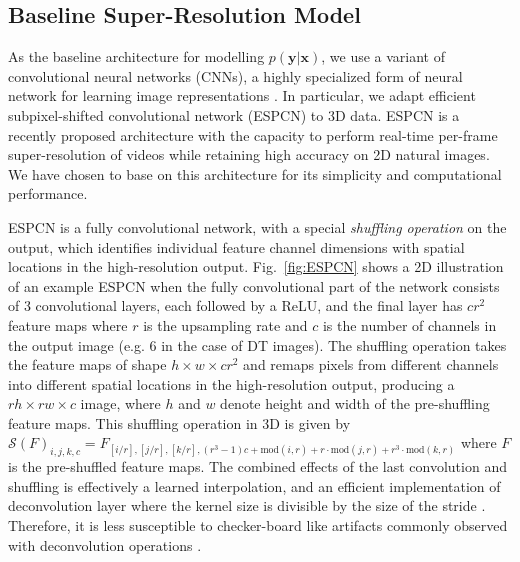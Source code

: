 \subsection{Baseline Super-Resolution Model} \label{sec:baseline}
As the baseline architecture for modelling $p(\mathbf{y}|\mathbf{x})$, we use a variant of convolutional neural networks (CNNs), a highly specialized form of neural network for learning image representations \cite{lecun2015deep,goodfellow2016deep}. In particular, we adapt efficient subpixel-shifted convolutional network (ESPCN) \cite{shi2016real} to 3D data.  ESPCN is a recently proposed architecture with the capacity to perform real-time per-frame super-resolution of videos while retaining high accuracy on 2D natural images. We have chosen to base on this architecture for its simplicity and computational performance. %

ESPCN is a fully convolutional network, with a special \emph{shuffling operation} on the output, which identifies individual feature channel dimensions with spatial locations in the high-resolution output. Fig.~\ref{fig:ESPCN} shows a 2D illustration of an example ESPCN when the fully convolutional part of the network consists of 3 convolutional layers, each followed by a ReLU, and the final layer has $cr^2$ feature maps where $r$ is the upsampling rate and $c$ is the number of channels in the output image (e.g. $6$ in the case of DT images). The shuffling operation takes the feature maps of shape $h\times w\times cr^2$ and remaps pixels from different channels into different spatial locations in the high-resolution output, producing a $rh\times rw\times c$ image, where $h$ and $w$ denote height and width of the pre-shuffling feature maps. This shuffling operation in 3D is given by $\mathcal{S}(F)_{i,j,k,c} =  F_{[i/r],[j/r],[k/r],(r^3-1)c + \text{mod}(i,r) + r\cdot \text{mod}(j,r) + r^3\cdot \text{mod}(k,r)}$ where $F$ is the pre-shuffled feature maps. The combined effects of the last convolution and shuffling is effectively a learned interpolation, and an efficient implementation of deconvolution layer \cite{zeiler2011adaptive} where the kernel size is divisible by the size of the stride \cite{shi2016real}. Therefore, it is less susceptible to checker-board like artifacts commonly observed with deconvolution operations \cite{odena2016deconvolution}.


